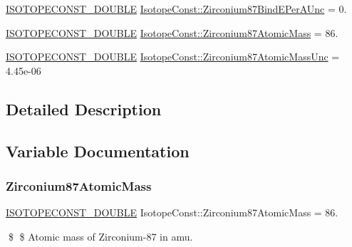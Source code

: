 \begin{DoxyCompactItemize}
\mbox{\hyperlink{group___isotope_const-_macros_ga8f45a7272ce02c0b4c65c44636ed719a}{I\+S\+O\+T\+O\+P\+E\+C\+O\+N\+S\+T\+\_\+\+D\+O\+U\+B\+LE}} \mbox{\hyperlink{group___isotope_const-_zirconium-_zr87_ga2b9f2ce301857bd0256a0602dded69b8}{Isotope\+Const\+::\+Zirconium87\+Bind\+E\+Per\+A\+Unc}} = 0.
\item 
\mbox{\hyperlink{group___isotope_const-_macros_ga8f45a7272ce02c0b4c65c44636ed719a}{I\+S\+O\+T\+O\+P\+E\+C\+O\+N\+S\+T\+\_\+\+D\+O\+U\+B\+LE}} \mbox{\hyperlink{group___isotope_const-_zirconium-_zr87_gaad5a984fe0a7814fe1006408c5875ee4}{Isotope\+Const\+::\+Zirconium87\+Atomic\+Mass}} = 86.
\item 
\mbox{\hyperlink{group___isotope_const-_macros_ga8f45a7272ce02c0b4c65c44636ed719a}{I\+S\+O\+T\+O\+P\+E\+C\+O\+N\+S\+T\+\_\+\+D\+O\+U\+B\+LE}} \mbox{\hyperlink{group___isotope_const-_zirconium-_zr87_gacb2bf5b9ca82ba919ab24bf2b06bd49a}{Isotope\+Const\+::\+Zirconium87\+Atomic\+Mass\+Unc}} = 4.\+45e-\/06
\end{DoxyCompactItemize}


\subsection{Detailed Description}


\subsection{Variable Documentation}
\mbox{\label{group___isotope_const-_zirconium-_zr87_gaad5a984fe0a7814fe1006408c5875ee4}} 
\subsubsection{\texorpdfstring{Zirconium87\+Atomic\+Mass}{Zirconium87AtomicMass}}
{\footnotesize\ttfamily \mbox{\hyperlink{group___isotope_const-_macros_ga8f45a7272ce02c0b4c65c44636ed719a}{I\+S\+O\+T\+O\+P\+E\+C\+O\+N\+S\+T\+\_\+\+D\+O\+U\+B\+LE}} Isotope\+Const\+::\+Zirconium87\+Atomic\+Mass = 86.}

\$ \$ Atomic mass of Zirconium-\/87 in amu. \mbox{\label{group___isotope_const-_zirconium-_zr87_gacb2bf5b9ca82ba919ab24bf2b06bd49a}} 

